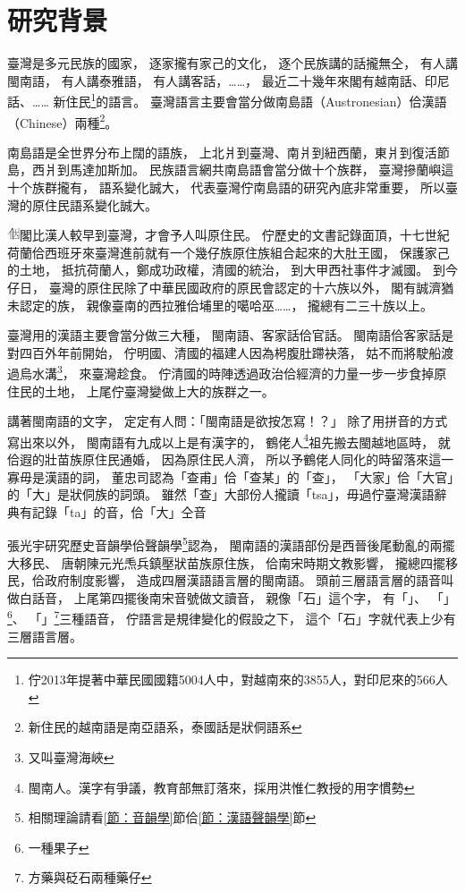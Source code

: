 \chapter{研究背景}
\label{章：研究背景}
臺灣是多元民族的國家，
逐家攏有家己的文化，
逐个民族講的話攏無仝，
有人講閩南語，
有人講泰雅語，
有人講客話，……，
最近二十幾年來閣有越南話、印尼話、……
新住民\footnote{佇2013年提著中華民國國籍5004人中，對越南來的3855人，對印尼來的566人\cite{國籍之歸化取得人數}}的語言。
臺灣語言主要會當分做南島語（Austronesian）佮漢語（Chinese）兩種\footnote{新住民的越南語是南亞語系，泰國話是狀侗語系}。

南島語是全世界分布上闊的語族\cite{臺灣原住民史李壬癸}，
上北爿到臺灣、南爿到紐西蘭，東爿到復活節島，西爿到馬達加斯加。
民族語言網\cite{Ethnologue}共南島語會當分做十个族群，
臺灣摻蘭嶼這十个族群攏有，
語系變化誠大，
代表臺灣佇南島語的研究內底非常重要，
所以臺灣的原住民語系變化誠大。

\includegraphics[height=1em]{字/⿰因}閣比漢人較早到臺灣，才會予人叫原住民。
佇歷史的文書記錄面頂，十七世紀荷蘭佮西班牙來臺灣進前就有一个幾仔族原住族組合起來的大肚王國\cite{中研院民族所數位典藏大肚番王傳奇}，
保護家己的土地，
抵抗荷蘭人，鄭成功政權，清國的統治，
到大甲西社事件才滅國。
到今仔日，
臺灣的原住民除了中華民國政府的原民會認定的十六族以外，
閣有誠濟猶未認定的族，
親像臺南的西拉雅佮埔里的噶哈巫……，
攏總有二三十族以上。

臺灣用的漢語主要會當分做三大種，
閩南語、客家話佮官話\cite{外省族群的母語與國語}。
閩南語佮客家話是對四百外年前開始，
佇明國、清國的福建人因為枵腹肚蹛袂落，
姑不而將駛船渡過烏水溝\footnote{又叫臺灣海峽}，
來臺灣趁食。
佇清國的時陣透過政治佮經濟的力量一步一步食掉原住民的土地，
上尾佇臺灣變做上大的族群之一。

講著閩南語的文字，
定定有人問：「閩南語是欲按怎寫！？」
除了用拼音的方式寫出來以外，
閩南語有九成以上是有漢字的\cite{洪惟仁閩南語九成有漢字}，
鶴佬人\footnote{閩南人。漢字有爭議，教育部無訂落來，採用洪惟仁教授的用字慣勢}祖先搬去閩越地區時，
就佮遐的壯苗族原住民通婚，
因為原住民人濟，
所以予鶴佬人同化的時留落來這一寡毋是漢語的詞，
董忠司\cite{董忠司非漢語初探}認為「查甫」佮「查某」的「查」，
「大家」佮「大官」的「大」是狀侗族的詞頭。
雖然「查」大部份人攏讀「tsa」，毋過佇臺灣漢語辭典\cite{臺灣漢語辭典}有記錄「ta」的音，佮「大」仝音

張光宇\cite{閩客方言史稿}研究歷史音韻學佮聲韻學\footnote{相關理論請看\ref{節：音韻學}節佮\ref{節：漢語聲韻學}節}認為，
閩南語的漢語部份是西晉後尾動亂的兩擺大移民、
唐朝陳元光𤆬兵鎮壓狀苗族原住族，
佮南宋時期文教影響，
攏總四擺移民，佮政府制度影響，
造成四層漢語語言層的閩南語。
頭前三層語言層的語音叫做白話音，
上尾第四擺後南宋音號做文讀音，
親像「石」這个字，
有「」、
「」\footnote{一種果子}、
「」\footnote{方藥與砭石兩種藥仔}三種語音，
佇語言是規律變化的假設之下，
這个「石」字就代表上少有三層語言層。

